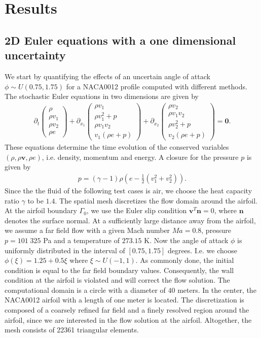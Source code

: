 \section{Results}
\label{sec:results}

\subsection{2D Euler equations with a one dimensional uncertainty}
We start by quantifying the effects of an uncertain angle of attack $\phi\sim U(0.75,1.75)$ for a NACA0012 profile computed with different methods. The stochastic Euler equations in two dimensions are given by
\begin{align*}
\partial_t
\begin{pmatrix}
\rho \\ \rho v_1 \\ \rho v_2 \\ \rho e
\end{pmatrix}
+\partial_{x_1}
\begin{pmatrix}
\rho v_1 \\ \rho v_1^2 +p \\ \rho v_1 v_2 \\  v_1 (\rho e+p)
\end{pmatrix}
+\partial_{x_2}
\begin{pmatrix}
\rho v_2 \\ \rho v_1 v_2 \\ \rho v_2^2+p \\ v_2 (\rho e+p)
\end{pmatrix}
=\bm{0}.
\end{align*}
These equations determine the time evolution of the conserved variables $(\rho,\rho \bm v, \rho e)$, i.e. density, momentum and energy. A closure for the pressure $p$ is given by
\begin{align*}
p = (\gamma-1)\rho\left(e-\frac12(v_1^2+v_2^2)\right).
\end{align*}
Since the the fluid of the following test cases is air, we choose the heat capacity ratio $\gamma$ to be $1.4$. The spatial mesh discretizes the flow domain around the airfoil. At the airfoil boundary $\Gamma_{0}$, we use the Euler slip condition $\bm v^T\bm n = 0$, where $\bm n$ denotes the surface normal. At a sufficiently large distance away from the airfoil, we assume a far field flow with a given Mach number $Ma = 0.8$, pressure $p = 101\;325$ Pa and a temperature of $273.15$ K. Now the angle of attack $\phi$ is uniformly distributed in the interval of $[0.75,1.75]$ degrees. I.e. we choose $\phi(\xi) = 1.25 + 0.5\xi$ where $\xi\sim U(-1,1)$. As commonly done, the initial condition is equal to the far field boundary values. Consequently, the wall condition at the airfoil is violated and will correct the flow solution. The computational domain is a circle with a diameter of $40$ meters. In the center, the NACA0012 airfoil with a length of one meter is located. The discretization is composed of a coarsely refined far field and a finely resolved region around the airfoil, since we are interested in the flow solution at the airfoil. Altogether, the mesh consists of 22361 triangular elements.

